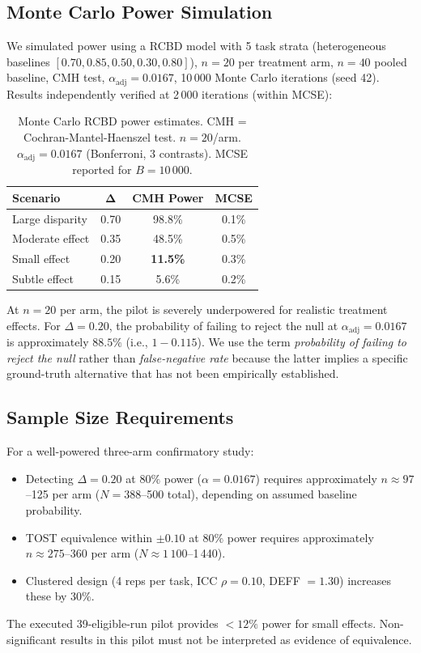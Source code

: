 \documentclass[conference]{IEEEtran}
\begin{document}
\subsection{Monte Carlo Power Simulation}

We simulated power using a RCBD model with 5 task strata (heterogeneous baselines $[0.70, 0.85, 0.50, 0.30, 0.80]$), $n=20$ per treatment arm, $n=40$ pooled baseline, CMH test, $\alpha_{\mathrm{adj}}=0.0167$, 10\,000 Monte Carlo iterations (seed 42). Results independently verified at 2\,000 iterations (within MCSE):

\begin{table}[t]
\centering
\footnotesize
\caption{Monte Carlo RCBD power estimates. CMH = Cochran-Mantel-Haenszel test. $n=20$/arm. $\alpha_{\mathrm{adj}}=0.0167$ (Bonferroni, 3 contrasts). MCSE reported for $B=10\,000$.}
\label{tab:power}
\begin{tabular}{lccc}
\toprule
\textbf{Scenario} & $\boldsymbol{\Delta}$ & \textbf{CMH Power} & \textbf{MCSE} \\
\midrule
Large disparity   & 0.70 & 98.8\% & 0.1\% \\
Moderate effect   & 0.35 & 48.5\% & 0.5\% \\
Small effect      & 0.20 & \textbf{11.5\%} & 0.3\% \\
Subtle effect     & 0.15 & 5.6\%  & 0.2\% \\
\bottomrule
\end{tabular}
\end{table}

At $n=20$ per arm, the pilot is severely underpowered for realistic treatment effects. For $\Delta=0.20$, the probability of failing to reject the null at $\alpha_{\mathrm{adj}}=0.0167$ is approximately $88.5\%$ (i.e., $1 - 0.115$). We use the term \emph{probability of failing to reject the null} rather than \emph{false-negative rate} because the latter implies a specific ground-truth alternative that has not been empirically established.

\subsection{Sample Size Requirements}

For a well-powered three-arm confirmatory study:
\begin{itemize}
    \item Detecting $\Delta=0.20$ at $80\%$ power ($\alpha=0.0167$) requires approximately $n \approx 97$--125 per arm ($N = 388$--500 total), depending on assumed baseline probability.
    \item TOST equivalence within $\pm 0.10$ at $80\%$ power requires approximately $n \approx 275$--360 per arm ($N \approx 1\,100$--1\,440).
    \item Clustered design (4 reps per task, ICC $\rho=0.10$, DEFF $= 1.30$) increases these by 30\%.
\end{itemize}
The executed 39-eligible-run pilot provides $< 12\%$ power for small effects. Non-significant results in this pilot must not be interpreted as evidence of equivalence.
\end{document}
